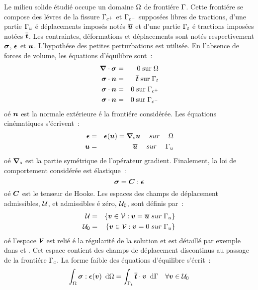 Le milieu solide \'etudi\'e occupe un domaine ${\Omega}$ de fronti\'ere
${\Gamma}$. Cette fronti\'ere se compose des l\'evres de la fissure ${\Gamma}_{c^+}$ et ${\Gamma}_{c^-}$  suppos\'ees libres
 de tractions, d'une partie ${\Gamma}_u$ \'e d\'eplacements impos\'es not\'es   $\overline{\mbox{\boldmath $u$}}$ et
d'une partie ${\Gamma}_t$ \'e tractions impos\'ees not\'ees   $\overline{\mbox{\boldmath $t$}}$.
Les contraintes, d\'eformations et d\'eplacements sont not\'es
respectivement $\mbox{\boldmath $\sigma$}$, $\mbox{\boldmath $\epsilon$}$ et $\mbox{\boldmath $u$}$. L'hypoth\'ese des petites
perturbations est utilis\'ee.
En l'absence de forces de volume, les \'equations d'\'equilibre sont~:
\begin{eqnarray}
\label{eq:equil}
\mbox{\boldmath $\nabla$} \cdot \mbox{\boldmath $\sigma$} & = & \mbox{\boldmath 0} \text{\;sur\;} {\Omega}  \\
\mbox{\boldmath $\sigma$} \cdot \mbox{\boldmath $n$} & = & \overline{\mbox{\boldmath $t$}} \text{\;sur\;} {\Gamma}_t            \\
\mbox{\boldmath $\sigma$} \cdot \mbox{\boldmath $n$} & = &  0  \text{\;sur\;} {\Gamma}_{c^+}        \\
\mbox{\boldmath $\sigma$} \cdot \mbox{\boldmath $n$} & = & 0  \text{\;sur\;} {\Gamma}_{c^-}
\end{eqnarray}
o\'e $\mbox{\boldmath $n$}$ est la normale ext\'erieure \'e la fronti\'ere consid\'er\'ee. Les
\'equations cin\'ematiques s'\'ecrivent~:
\begin{eqnarray}
    \mbox{\boldmath $\epsilon$} & = & \mbox{\boldmath $\epsilon$}(\mbox{\boldmath $u$}) = \mbox{\boldmath $\nabla$}_{\mathrm{s}} \mbox{\boldmath $u$}  \quad\mbox\;sur\;\quad
    {\Omega} \\
    \mbox{\boldmath $u$}   & = & \overline{\mbox{\boldmath $u$}}  \quad\mbox\;sur\;\quad {\Gamma}_u
\end{eqnarray}
o\'e $\mbox{\boldmath $\nabla$}_{\mathrm{s}}$ est la partie sym\'etrique de l'op\'erateur
gradient.  Finalement, la loi de comportement consid\'er\'ee est
\'elastique~:
\begin{equation}
    \mbox{\boldmath $\sigma$} = \mbox{\boldmath $C$}:\mbox{\boldmath $\epsilon$}
\end{equation}
o\'e $\mbox{\boldmath $C$}$ est le tenseur de Hooke.
Les espaces des champs de d\'eplacement admissibles, $\cu$, et
admissibles \'e z\'ero, $\cu_0$, sont d\'efinis par~:
\begin{eqnarray}
    \cu & = & \{ \bfv \in \cv: \bfv = \overline{\bfu} \text\;sur\; \Gam_u \} \\
    \cu_0 & = & \{ \bfv \in \cv: \bfv = \bfzer \text\;sur\; \Gam_u \}
\end{eqnarray}
o\'e l'espace $\cv$ est reli\'e \'e la r\'egularit\'e de la solution
et est d\'etaill\'e par exemple dans \cite{Babuska:Corners} et \cite{Grisvard:ellip}.  Cet espace
contient des champs de d\'eplacement discontinus au passage de la fronti\'ere ${\Gamma}_c$.
La forme faible des \'equations d'\'equilibre s'\'ecrit~:
\begin{equation}
    \int_{\Ome}    \bfsig:\bfeps(\bfv) \dint \Ome =
    \int_{\Gam_t} \ov{\bft}\cdot\bfv  \dint \Gam
    \quad \forall \bfv \in \cu_0
    \label{eq:equil2}
\end{equation}
